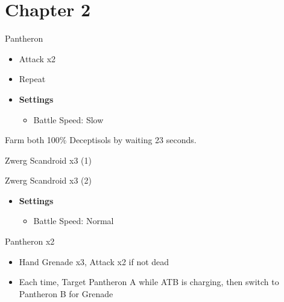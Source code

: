 \chapter{Chapter 2}

	\begin{battle}[0:10]{Pantheron}
		\begin{itemize}
			\item Attack x2
			\item Repeat
		\end{itemize}
	\end{battle}

	\begin{menu}
		\begin{itemize}
			\item \textbf{Settings}
			      \begin{itemize}
				      \item Battle Speed: Slow
			      \end{itemize}
		\end{itemize}
	\end{menu}

	Farm both 100\% Deceptisols by waiting 23 seconds.
	\begin{battle}[0:23]{Zwerg Scandroid x3 (1)}
	\end{battle}

	\begin{battle}[0:23]{Zwerg Scandroid x3 (2)}
	\end{battle}

	\begin{menu}
		\begin{itemize}
			\item \textbf{Settings}
			      \begin{itemize}
				      \item Battle Speed: Normal
			      \end{itemize}
		\end{itemize}
	\end{menu}

	\begin{battle}[0:16]{Pantheron x2}
		\begin{itemize}
			\item Hand Grenade x3, Attack x2 if not dead
			\item Each time, Target Pantheron A while ATB is charging, then switch to Pantheron B for Grenade
		\end{itemize}
	\end{battle}

